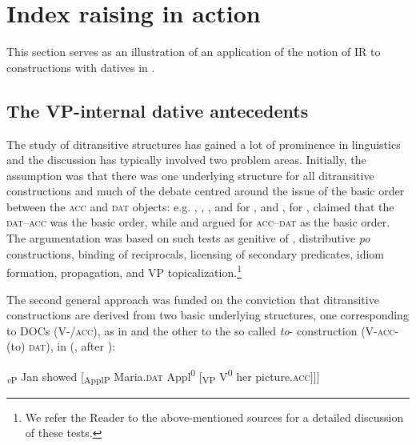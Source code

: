 \documentclass[output=paper,nonflat,colorlinks,citecolor=brown,newtxmath]{langsci/langscibook}
\begin{document}
\section{Index raising in action}\label{sec:witkos:s3}

This section serves as an illustration of an application of the notion of IR to constructions with datives in .

\subsection{The VP-internal dative antecedents}\label{s3.1}

The study of ditransitive structures has gained a lot of prominence in  linguistics and the discussion has typically involved two problem areas. Initially, the assumption was that there was one underlying structure for all ditransitive constructions and much of the debate  centred around the issue of the basic order between the \textsc{acc} and \textsc{dat} objects: e.g. \citet{willim1989}, \citet{witkos1998,witkos2007,witkos2008}, \citet{tajsner2008}, and \cite{citko2011} for , and \citet{franks1995}, \citet{dyakonova2007,dyakonova2009} for , claimed that the \textsc{dat}--\textsc{acc} was the basic order, while \citet{bailyn1996,bailyn2010insidevp,bailyn2012} and \cite{antonyuk2015} argued for \textsc{acc}--\textsc{dat} as the basic order. The argumentation was based on such tests as genitive of , distributive \textit{po} constructions, binding of reciprocals, licensing of secondary predicates, idiom formation,  propagation, and VP topicalization.\footnote{\label{fn18}We refer the Reader to the above-mentioned sources for a detailed discussion of these tests.}

\largerpage[2]
The second general approach was funded on the conviction that ditransitive  constructions are derived from two basic underlying structures, one corresponding to  DOCs (V-/\textsc{acc}), as in  and the other to the so called \textit{to}- construction (V-\textsc{acc}- (to) \textsc{dat}), in (, after \cite{dvorak2010}):

\ea  \label{ex:witkos:21} \minsp{[} \textsubscript{\textit{v}P} Jan showed [\textsubscript{ApplP} Maria.\textsc{dat} Appl\textsuperscript{0} [\textsubscript{VP} V\textsuperscript{0} her picture.\textsc{acc}$]]]$\\
\z
\end{document}
